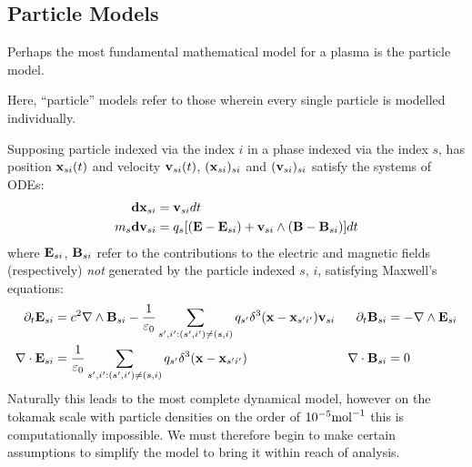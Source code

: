 \subsection*{Particle Models}
    Perhaps the most fundamental mathematical model for a plasma is the particle model.
    \begin{definition}
        Here, ``particle'' models refer to those wherein every single particle is modelled individually.
    \end{definition}
    Supposing particle indexed via the index $i$ in a phase indexed via the index $s$, has position $\mathbf{x}_{si}(t)$ and velocity $\mathbf{v}_{si}(t)$, $(\mathbf{x}_{si})_{si}$ and $(\mathbf{v}_{si})_{si}$ satisfy the systems of ODEs:
    \begin{align}
        \mathbf{d}\mathbf{x}_{si}  &=  \mathbf{v}_{si} dt  \label{patricle motion}  \\
        m_{s}\mathbf{d}\mathbf{v}_{si}  &=  q_{s}[(\mathbf{E} - \mathbf{E}_{si}) + \mathbf{v}_{si}\wedge(\mathbf{B} - \mathbf{B}_{si})]dt  \label{particle forcing}
    \end{align}
    where $\mathbf{E}_{si}$, $\mathbf{B}_{si}$ refer to the contributions to the electric and magnetic fields (respectively) \emph{not} generated by the particle indexed $s$, $i$, satisfying Maxwell's equations:
    \begin{align*}
        \partial_{t}\mathbf{E}_{si}  &=  c^{2}\nabla\wedge\mathbf{B}_{si} - \frac{1}{\varepsilon_{0}}\sum_{s', i' : (s', i') \neq (s, i)}q_{s'}\delta^{3}(\mathbf{x} - \mathbf{x}_{s'i'})\mathbf{v}_{si}  &
        \partial_{t}\mathbf{B}_{si}  &=  - \nabla\wedge\mathbf{E}_{si}  \\
        \nabla\cdot\mathbf{E}_{si}  &=  \frac{1}{\varepsilon_{0}}\sum_{s', i' : (s', i') \neq (s, i)}q_{s'}\delta^{3}(\mathbf{x} - \mathbf{x}_{s'i'})  &
        \nabla\cdot\mathbf{B}_{si}  &=  0
    \end{align*}
    Naturally this leads to the most complete dynamical model, however on the tokamak scale with particle densities on the order of $10^{- 5}{\rm mol}^{- 1}$ this is computationally impossible. We must therefore begin to make certain assumptions to simplify the model to bring it within reach of analysis.
    